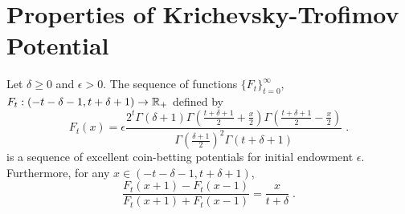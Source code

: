 \section{Properties of Krichevsky-Trofimov Potential}

\begin{theorem}[KT potential]
\label{theorem:kt-potential}
Let $\delta \ge 0$ and $\epsilon > 0$. The sequence of functions
$\{F_t\}_{t=0}^\infty$, $F_t:(-t-\delta-1, t+\delta+1) \to \mathbb{R}_+$ defined by
$$
F_t(x) = \epsilon \frac{2^t \Gamma(\delta + 1) \Gamma(\frac{t+\delta+1}{2} + \frac{x}{2}) \Gamma(\frac{t+\delta+1}{2} - \frac{x}{2})}{\Gamma(\frac{\delta+1}{2})^2 \Gamma(t+\delta+1)} \; .
$$
is a sequence of excellent coin-betting potentials for initial endowment $\epsilon$.
Furthermore, for any $x \in (-t-\delta-1, t+\delta+1)$,
$$
\frac{F_t(x+1) - F_{t}(x-1)}{F_t(x+1) + F_{t}(x-1)} = \frac{x}{t+\delta} \; .
$$
\end{theorem}

